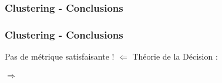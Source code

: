 
\begin{frame}
  \frametitle{Clustering - Conclusions}
\end{frame}

\begin{frame}
  \frametitle{Clustering - Conclusions}
  \begin{center}
    Pas de métrique satisfaisante ! $\Leftarrow$ Théorie de la Décision : \\
    $\;$ \\
     \\
    $\Rightarrow$ \\
  \end{center}
\end{frame}

